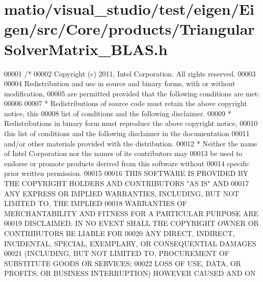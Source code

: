 \hypertarget{matio_2visual__studio_2test_2eigen_2_eigen_2src_2_core_2products_2_triangular_solver_matrix___b_l_a_s_8h_source}{}\section{matio/visual\+\_\+studio/test/eigen/\+Eigen/src/\+Core/products/\+Triangular\+Solver\+Matrix\+\_\+\+B\+L\+AS.h}
\label{matio_2visual__studio_2test_2eigen_2_eigen_2src_2_core_2products_2_triangular_solver_matrix___b_l_a_s_8h_source}

\begin{DoxyCode}
00001 \textcolor{comment}{/*}
00002 \textcolor{comment}{ Copyright (c) 2011, Intel Corporation. All rights reserved.}
00003 \textcolor{comment}{}
00004 \textcolor{comment}{ Redistribution and use in source and binary forms, with or without modification,}
00005 \textcolor{comment}{ are permitted provided that the following conditions are met:}
00006 \textcolor{comment}{}
00007 \textcolor{comment}{ * Redistributions of source code must retain the above copyright notice, this}
00008 \textcolor{comment}{   list of conditions and the following disclaimer.}
00009 \textcolor{comment}{ * Redistributions in binary form must reproduce the above copyright notice,}
00010 \textcolor{comment}{   this list of conditions and the following disclaimer in the documentation}
00011 \textcolor{comment}{   and/or other materials provided with the distribution.}
00012 \textcolor{comment}{ * Neither the name of Intel Corporation nor the names of its contributors may}
00013 \textcolor{comment}{   be used to endorse or promote products derived from this software without}
00014 \textcolor{comment}{   specific prior written permission.}
00015 \textcolor{comment}{}
00016 \textcolor{comment}{ THIS SOFTWARE IS PROVIDED BY THE COPYRIGHT HOLDERS AND CONTRIBUTORS "AS IS" AND}
00017 \textcolor{comment}{ ANY EXPRESS OR IMPLIED WARRANTIES, INCLUDING, BUT NOT LIMITED TO, THE IMPLIED}
00018 \textcolor{comment}{ WARRANTIES OF MERCHANTABILITY AND FITNESS FOR A PARTICULAR PURPOSE ARE}
00019 \textcolor{comment}{ DISCLAIMED. IN NO EVENT SHALL THE COPYRIGHT OWNER OR CONTRIBUTORS BE LIABLE FOR}
00020 \textcolor{comment}{ ANY DIRECT, INDIRECT, INCIDENTAL, SPECIAL, EXEMPLARY, OR CONSEQUENTIAL DAMAGES}
00021 \textcolor{comment}{ (INCLUDING, BUT NOT LIMITED TO, PROCUREMENT OF SUBSTITUTE GOODS OR SERVICES;}
00022 \textcolor{comment}{ LOSS OF USE, DATA, OR PROFITS; OR BUSINESS INTERRUPTION) HOWEVER CAUSED AND ON}

\end{DoxyCode}

